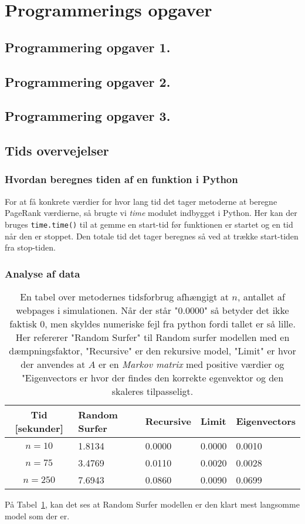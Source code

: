 \section{Programmerings opgaver}



\subsection*{Programmering opgaver 1.}



\subsection*{Programmering opgaver 2.}



\subsection*{Programmering opgaver 3.}


\subsection*{Tids overvejelser}
\subsubsection*{Hvordan beregnes tiden af en funktion i Python}
For at få konkrete værdier for hvor lang tid det tager metoderne at beregne PageRank værdierne, så brugte vi \emph{time} modulet indbygget i Python. Her kan der bruges \texttt{time.time()} til at gemme en start-tid før funktionen er startet og en tid når den er stoppet. Den totale tid det tager beregnes så ved at trække start-tiden fra stop-tiden.

\subsubsection*{Analyse af data}
\begin{table}[!h]
    \centering
    \begin{tabular}{c|l|l|l|l}
        Tid [sekunder] & Random Surfer & Recursive & Limit & Eigenvectors \\
        \hline
        $n = 10$       & 1.8134   & 0.0000   & 0.0000   & 0.0010   \\
        $n = 75$       & 3.4769   & 0.0110   & 0.0020   & 0.0028   \\
        $n = 250$      & 7.6943   & 0.0860   & 0.0090   & 0.0699
    \end{tabular}
    \caption{En tabel over metodernes tidsforbrug afhængigt at $n$, antallet af webpages i simulationen. Når der står "0.0000" så betyder det ikke faktisk 0, men skyldes numeriske fejl fra python fordi tallet er så lille. Her refererer "Random Surfer" til Random surfer modellen med en dæmpningsfaktor, "Recursive" er den rekursive model, "Limit" er hvor der anvendes at $A$ er en \textit{Markov matrix} med positive værdier og "Eigenvectors er hvor der findes den korrekte egenvektor og den skaleres tilpasseligt.}
    \label{tidsFigur}
\end{table}

På Tabel~\ref{tidsFigur}, kan det ses at Random Surfer modellen er den klart mest langsomme model som der er.
